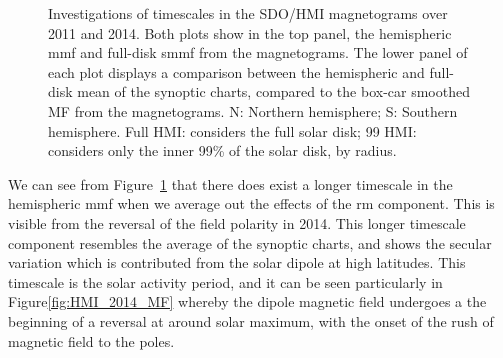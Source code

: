 \begin{figure}[!ht]
	\centering
	\qquad
	\caption{Investigations of timescales in the SDO/HMI magnetograms over 2011 and 2014. Both plots show in the top panel, the hemispheric \gls{mmf} and full-disk \gls{smmf} from the magnetograms. The lower panel of each plot displays a comparison between the hemispheric and full-disk mean of the synoptic charts, compared to the box-car smoothed MF from the magnetograms. N: Northern hemisphere; S: Southern hemisphere. Full HMI: considers the full solar disk; 99 HMI: considers only the inner 99\% of the solar disk, by radius.}
	\label{fig:HMI_MF_vs_synoptics}
\end{figure}

We can see from Figure~\ref{fig:HMI_MF_vs_synoptics} that there does exist a longer timescale in the hemispheric \gls{mmf} when we average out the effects of the \gls{rm} component. This is visible from the reversal of the field polarity in 2014. This longer timescale component resembles the average of the synoptic charts, and shows the secular variation which is contributed from the solar dipole at high latitudes. This timescale is the solar activity period, and it can be seen particularly in Figure\ref{fig:HMI_2014_MF} whereby the dipole magnetic field undergoes a the beginning of a reversal at around solar maximum, with the onset of the rush of magnetic field to the poles.


